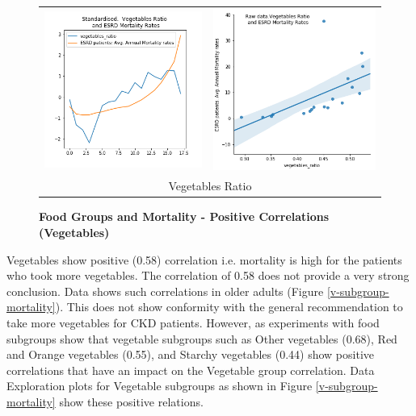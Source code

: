 \begin{figure}[!htb]
\small
\begin{tabular}{cc}	
	\includegraphics[scale=0.25]{./images/standard_vegetable_ratio.png} & 	
	 \includegraphics[scale=0.25]{./images/pairplot_vegetable_.png} 	  \\
	\multicolumn{2}{c}{Vegetables Ratio}  \\ 
\end{tabular}
\centering
\caption{\textbf{Food Groups and Mortality - Positive Correlations (Vegetables) }}
\label{vegetable-mortality}
\end{figure}

Vegetables show positive (0.58) correlation i.e. mortality is high for the patients who took more vegetables. The correlation of 0.58 does not provide a very strong conclusion. Data shows such correlations in older adults (Figure \ref{v-subgroup-mortality}). This does not show conformity with the general recommendation to take more vegetables for CKD patients. However, as experiments with food subgroups show that vegetable subgroups such as Other vegetables (0.68), Red and Orange vegetables (0.55), and Starchy vegetables (0.44) show positive correlations that have an impact on the Vegetable group correlation.  Data Exploration plots for Vegetable subgroups as shown in Figure \ref{v-subgroup-mortality} show these positive relations.

